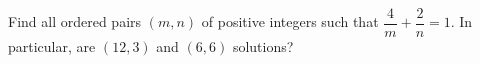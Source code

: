 Find all ordered pairs $(m,n)$ of positive integers such that $\dfrac{4}{m}+\dfrac{2}{n}=1$. In particular, are $(12,3)$ and $(6,6)$ solutions?
